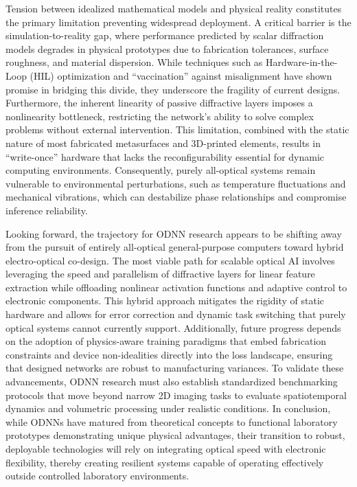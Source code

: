 \documentclass[11pt]{article}
\begin{document}
Tension between idealized mathematical models and physical reality constitutes the primary limitation preventing widespread deployment. A critical barrier is the simulation-to-reality gap, where performance predicted by scalar diffraction models degrades in physical prototypes due to fabrication tolerances, surface roughness, and material dispersion. While techniques such as Hardware-in-the-Loop (HIL) optimization and ``vaccination'' against misalignment have shown promise in bridging this divide, they underscore the fragility of current designs. Furthermore, the inherent linearity of passive diffractive layers imposes a nonlinearity bottleneck, restricting the network's ability to solve complex problems without external intervention. This limitation, combined with the static nature of most fabricated metasurfaces and 3D-printed elements, results in ``write-once'' hardware that lacks the reconfigurability essential for dynamic computing environments. Consequently, purely all-optical systems remain vulnerable to environmental perturbations, such as temperature fluctuations and mechanical vibrations, which can destabilize phase relationships and compromise inference reliability.

Looking forward, the trajectory for ODNN research appears to be shifting away from the pursuit of entirely all-optical general-purpose computers toward hybrid electro-optical co-design. The most viable path for scalable optical AI involves leveraging the speed and parallelism of diffractive layers for linear feature extraction while offloading nonlinear activation functions and adaptive control to electronic components. This hybrid approach mitigates the rigidity of static hardware and allows for error correction and dynamic task switching that purely optical systems cannot currently support. Additionally, future progress depends on the adoption of physics-aware training paradigms that embed fabrication constraints and device non-idealities directly into the loss landscape, ensuring that designed networks are robust to manufacturing variances. To validate these advancements, ODNN research must also establish standardized benchmarking protocols that move beyond narrow 2D imaging tasks to evaluate spatiotemporal dynamics and volumetric processing under realistic conditions. In conclusion, while ODNNs have matured from theoretical concepts to functional laboratory prototypes demonstrating unique physical advantages, their transition to robust, deployable technologies will rely on integrating optical speed with electronic flexibility, thereby creating resilient systems capable of operating effectively outside controlled laboratory environments.



\end{document}
